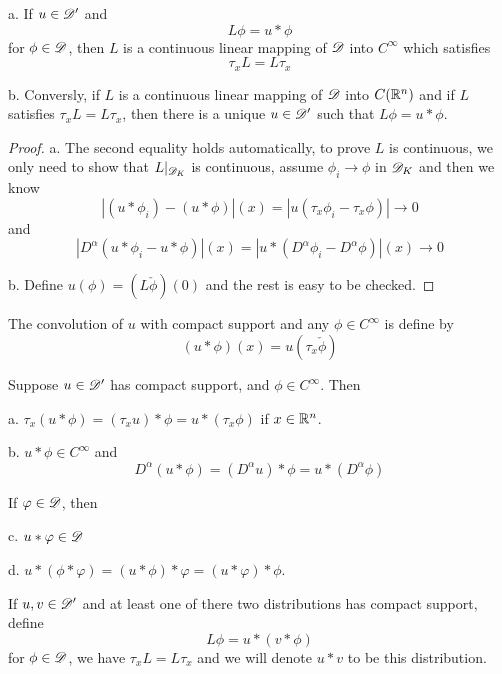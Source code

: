 \begin{theorem}
    a. If $u\in\mathscr{D}'$ and
    \[L\phi = u*\phi\]
    for $\phi \in \mathscr{D}$, then $L$ is a continuous linear mapping of $\mathscr{D}$ into $C^{\infty}$ which satisfies
    \[\tau_xL = L\tau_x\]\par
    b. Conversly, if $L$ is a continuous linear mapping of $\mathscr{D}$ into $C(\mathbb{R}^n)$ and if $L$ satisfies $\tau_x L = L\tau_x$, then there is a unique $u\in\mathscr{D}'$ such that $L\phi = u*\phi$.
\end{theorem}
\begin{proof}
    a. The second equality holds automatically, to prove $L$ is continuous, we only need to show that $L|_{\mathscr{D}_K}$ is continuous, assume $\phi_i \to \phi$ in $\mathscr{D}_K$ and then we know
    \[
    |(u*\phi_i)-(u*\phi)|(x) = |u(\tau_x\phi_i - \tau_x\phi)| \to 0
    \]
    and
    \[
    |D^{\alpha}(u*\phi_i - u*\phi)|(x) = |u*(D^{\alpha}\phi_i - D^{\alpha}\phi)|(x) \to 0 
    \]\par
    b. Define $u(\phi) = (L\check{\phi})(0)$ and the rest is easy to be checked.
\end{proof}

\begin{definition}
    The convolution of $u$ with compact support and any $\phi\in C^{\infty}$ is define by
    \[
    (u*\phi)(x) = u(\tau_x\check{\phi})
    \]
\end{definition}
\begin{theorem}
    Suppose $u\in\mathscr{D}'$ has compact support, and $\phi \in C^{\infty}$. Then\par
    a. $\tau_x(u*\phi) = (\tau_x u)*\phi = u*(\tau_x\phi)$ if $x\in\mathbb{R}^n$.\par
    b. $u*\phi \in C^{\infty}$ and
        \[D^{\alpha}(u*\phi) = (D^{\alpha}u)*\phi = u*(D^{\alpha}\phi)\]\par
    If $\varphi \in \mathscr{D}$, then\par
    c. $u*\varphi \in \mathscr{D}$\par
    d. $u*(\phi*\varphi) = (u*\phi)*\varphi = (u*\varphi)*\phi$.
\end{theorem}

\begin{definition}
    If $u,v\in \mathscr{D}'$ and at least one of there two distributions has compact support, define
    \[L\phi = u*(v*\phi)\]
    for $\phi \in \mathscr{D}$, we have $\tau_xL = L\tau_x$ and we will denote $u*v$ to be this distribution.
\end{definition}

